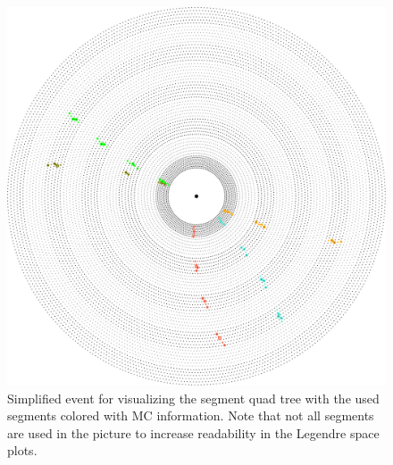 \begin{figure}
  \centering
  \includegraphics[width=0.9\linewidth]{figures/workflow/quad_tree_segments_event.pdf}
  \caption{Simplified event for visualizing the segment quad tree with the used segments colored with MC information. Note that not all segments are used in the picture to increase readability in the Legendre space plots.}
  \label{fig-quad-tree-event}
\end{figure}


